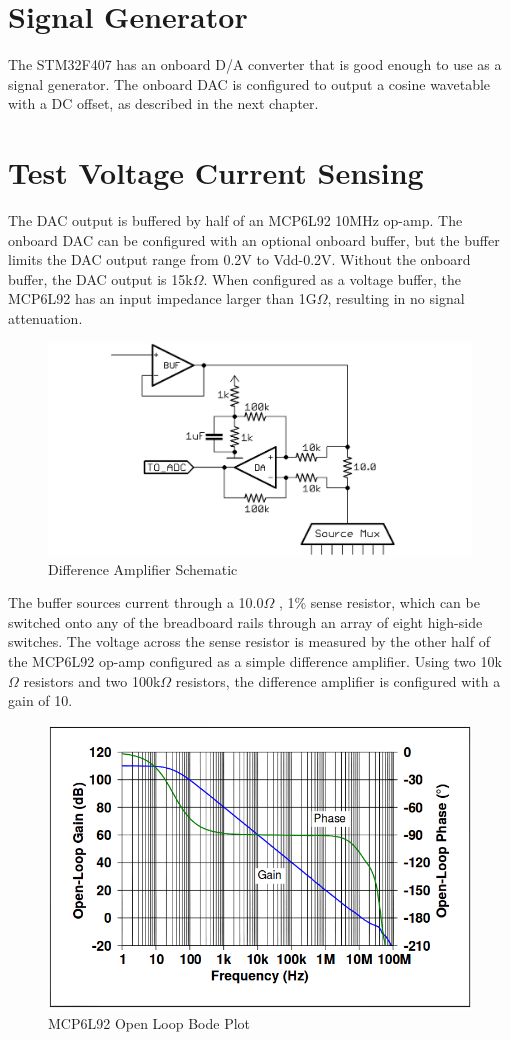 \documentclass[11pt,twoside]{mitthesis}
\newcommand{\ohm}{$\Omega$ }
\begin{document}
\section{Signal Generator}

The STM32F407 has an onboard D/A converter that is good enough to use as a signal generator.
The onboard DAC is configured to output a cosine wavetable with a DC offset, as described in the next chapter.

\section{Test Voltage Current Sensing}

The DAC output is buffered by half of an MCP6L92 10MHz op-amp.
The onboard DAC can be configured with an optional onboard buffer, but the buffer limits the DAC output range from 0.2V to Vdd-0.2V.
Without the onboard buffer, the DAC output is 15k$\Omega$.
When configured as a voltage buffer, the MCP6L92 has an input impedance larger than 1G$\Omega$, resulting in no signal attenuation.

\begin{figure}[h!]
  \begin{center}
      \includegraphics[width=.7\textwidth]{../DA.png}
      \caption{Difference Amplifier Schematic}
  \end{center}
\end{figure}

The buffer sources current through a 10.0\ohm, 1\% sense resistor, which can be switched onto any of the breadboard rails through an array of eight high-side switches.
The voltage across the sense resistor is measured by the other half of the MCP6L92 op-amp configured as a simple difference amplifier.
Using two 10k\ohm resistors and two 100k\ohm resistors, the difference amplifier is configured with a gain of 10.  

\begin{figure}[h!]
  \begin{center}
      \includegraphics[width=.6\textwidth]{../opamp-bode.png}
      \caption{MCP6L92 Open Loop Bode Plot}
  \end{center}
\end{figure}
\end{document}
